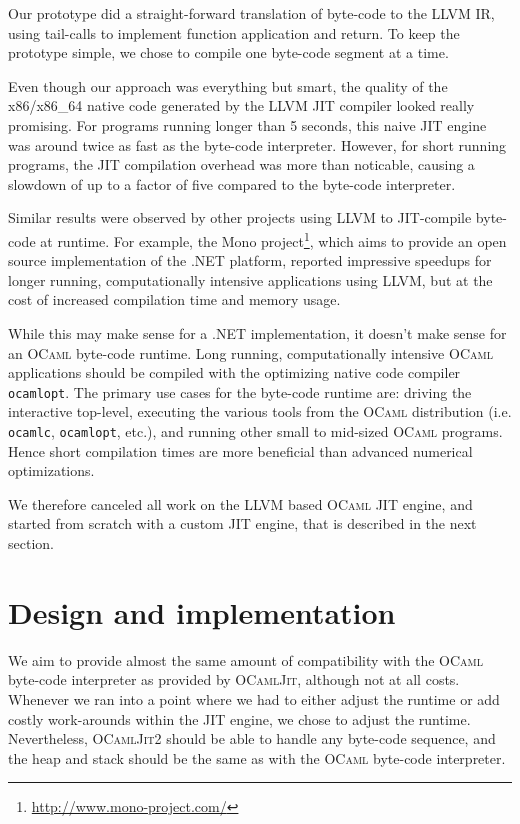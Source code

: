 \documentclass[10pt,a4paper,twocolumn]{article}
\begin{document}
Our prototype did a straight-forward translation of byte-code to the \textsc{LLVM} IR, using tail-calls
to implement function application and return. To keep the prototype simple, we chose to compile one
byte-code segment at a time.

Even though our approach was everything but smart, the quality of the x86/x86\_64 native code generated by
the \textsc{LLVM} JIT compiler looked really promising. For programs running longer than 5 seconds,
this naive JIT engine was around twice as fast as the byte-code interpreter. However, for short running
programs, the JIT compilation overhead was more than noticable, causing a slowdown of up to a factor of
five compared to the byte-code interpreter.

Similar results were observed by other projects using \textsc{LLVM} to JIT-compile byte-code at runtime.
For example, the Mono project\footnote{\url{http://www.mono-project.com/}}, which aims to provide an open source
implementation of the .NET platform, reported impressive speedups for longer running, computationally intensive
applications using \textsc{LLVM}, but at the cost of increased compilation time and memory usage.

While this may make sense for a .NET implementation, it doesn't make sense for an \textsc{OCaml}
byte-code runtime. Long running, computationally intensive \textsc{OCaml} applications should be
compiled with the optimizing native code compiler \texttt{ocamlopt}. The primary use cases for the
byte-code runtime are: driving the interactive top-level, executing the various tools from the
\textsc{OCaml} distribution (i.e. \texttt{ocamlc}, \texttt{ocamlopt}, etc.), and running other small
to mid-sized \textsc{OCaml} programs. Hence short compilation times are more beneficial than advanced
numerical optimizations.

We therefore canceled all work on the \textsc{LLVM} based \textsc{OCaml} JIT engine, and started from
scratch with a custom JIT engine, that is described in the next section.


\section{Design and implementation} \label{section:Design_and_implementation}

We aim to provide almost the same amount of compatibility with the \textsc{OCaml} byte-code interpreter
as provided by \textsc{OCamlJit}, although not at all costs. Whenever we ran into a point where we had
to either adjust the runtime or add costly work-arounds within the JIT engine, we chose to adjust the
runtime. Nevertheless, \textsc{OCamlJit2} should be able to handle any byte-code sequence, and the
heap and stack should be the same as with the \textsc{OCaml} byte-code interpreter.
\end{document}
